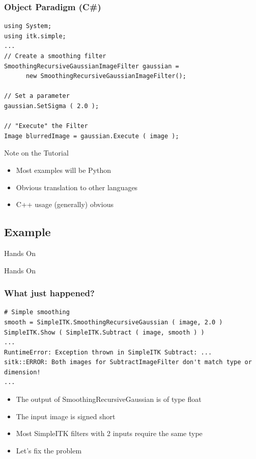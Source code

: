 \begin{frame}[fragile]
\frametitle{Object Paradigm (C\#)}
\lstjava
\begin{lstlisting}
using System;
using itk.simple;
...
// Create a smoothing filter
SmoothingRecursiveGaussianImageFilter gaussian =
      new SmoothingRecursiveGaussianImageFilter();

// Set a parameter
gaussian.SetSigma ( 2.0 );

// "Execute" the Filter
Image blurredImage = gaussian.Execute ( image );
\end{lstlisting}
\end{frame}


\begin{frame}{Note on the Tutorial}
\begin{itemize}
  \item Most examples will be Python
  \item Obvious translation to other languages
  \item C++ usage (generally) obvious
\end{itemize}
\end{frame}

\subsection{Example}
\begin{frame}{Hands On}
\fontsize{36pt}{36pt}\selectfont
\center
\begin{center}
Hands On
\end{center}
\end{frame}

\begin{frame}[fragile]
\frametitle{What just happened?}
\lstpython
\begin{lstlisting}
# Simple smoothing
smooth = SimpleITK.SmoothingRecursiveGaussian ( image, 2.0 )
SimpleITK.Show ( SimpleITK.Subtract ( image, smooth ) )
...
RuntimeError: Exception thrown in SimpleITK Subtract: ...
sitk::ERROR: Both images for SubtractImageFilter don't match type or dimension!
...
\end{lstlisting}

\begin{itemize}
  \item The output of SmoothingRecursiveGaussian is of type float
  \item The input image is signed short
  \item Most SimpleITK filters with 2 inputs require the same type
  \item Let's fix the problem
\end{itemize}

\end{frame}

